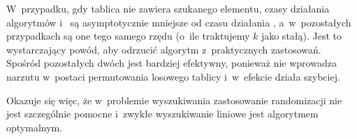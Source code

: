 \subproblem %
W~przypadku, gdy tablica nie zawiera szukanego elementu, czasy działania algorytmów  i~ są asymptotycznie mniejsze od czasu działania , a~w~pozostałych przypadkach są one tego samego rzędu (o~ile traktujemy $k$ jako stałą). Jest to wystarczający powód, aby odrzucić algorytm  z~praktycznych zastosowań. Spośród pozostałych dwóch  jest bardziej efektywny, ponieważ nie wprowadza narzutu w~postaci permutowania losowego tablicy i~w~efekcie działa szybciej.

Okazuje się więc, że w~problemie wyszukiwania zastosowanie randomizacji nie jest szczególnie pomocne i~zwykłe wyszukiwanie liniowe jest algorytmem optymalnym.

\endinput
